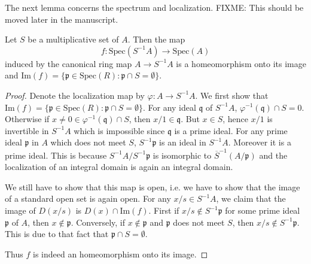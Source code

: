 \noindent
The next lemma concerns the spectrum and localization.
FIXME: This should be moved later in the manuscript.

\begin{lemma}
\label{lemma-spec-localization-first}
Let $S$ be a multiplicative set of $A$. Then the map
$$
f: \text{Spec}(S^{-1}A)\longrightarrow \text{Spec}(A)
$$
induced by the canonical ring map
$A \rightarrow S^{-1}A$ is a homeomorphism onto its image and
$\text{Im}(f)=
\{ \mathfrak p\in \text{Spec}(R): \mathfrak p\cap S = \emptyset \}$.
\end{lemma}

\begin{proof}
Denote the localization map by $\varphi : A\rightarrow S^{-1}A$. We first
show that
$\text{Im}(f) = \{ \mathfrak p\in \text{Spec}(R):
\mathfrak p\cap S = \emptyset \}$. For any
ideal
$\mathfrak q$ of $S^{-1}A$, $\varphi^{-1}(\mathfrak q)\cap S = {0}$.
Otherwise if $x\not = 0\in\varphi^{-1}(\mathfrak q)\cap S$, then
$x/1\in \mathfrak q$. But $x\in S$, hence $x/1$ is invertible in
$S^{-1}A$ which is impossible since $\mathfrak q$ is a prime ideal.
For any prime ideal $\mathfrak p$ in
$A$ which does not meet $S$, $S^{-1}\mathfrak p$ is an ideal in $S^{-1}A$.
Moreover it is a prime ideal. This is because $S^{-1}A/S^{-1}\mathfrak p$ is
isomorphic to $\overline{S}^{-1}(A/\mathfrak p)$ and the localization of an
integral domain is again an integral domain.

\medskip\noindent
We still have to show that this map is open, i.e. we have to show
that the image of a standard open set is again open. For any
$x/s\in S^{-1}A$, we claim that the image of $D(x/s)$ is
$D(x)\cap\text{Im}(f)$.
First if $x/s\not\in S^{-1}\mathfrak p$ for some prime
ideal $\mathfrak p$ of $A$, then $x\not\in\mathfrak p$.
Conversely, if $x\not\in\mathfrak p$
and $\mathfrak p$ does not meet $S$, then
$x/s\not\in S^{-1}\mathfrak p$. This is
due to that fact that $\mathfrak p\cap S = \emptyset$.

\medskip\noindent
Thus $f$ is indeed an homeomorphism onto its image.
\end{proof}


























